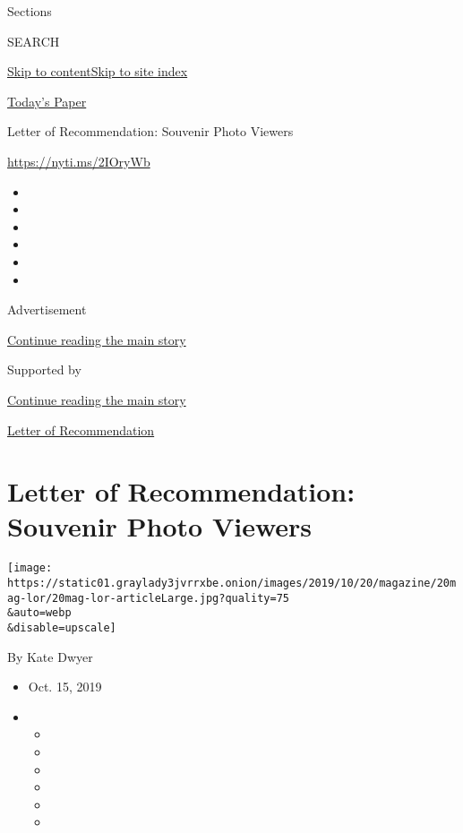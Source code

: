 Sections

SEARCH

\protect\hyperlink{site-content}{Skip to
content}\protect\hyperlink{site-index}{Skip to site index}

\href{https://myaccount.nytimes3xbfgragh.onion/auth/login?response_type=cookie\&client_id=vi}{}

\href{https://www.nytimes3xbfgragh.onion/section/todayspaper}{Today's
Paper}

Letter of Recommendation: Souvenir Photo Viewers

\url{https://nyti.ms/2IOryWb}

\begin{itemize}
\item
\item
\item
\item
\item
\item
\end{itemize}

Advertisement

\protect\hyperlink{after-top}{Continue reading the main story}

Supported by

\protect\hyperlink{after-sponsor}{Continue reading the main story}

\href{/column/letter-of-recommendation}{Letter of Recommendation}

\hypertarget{letter-of-recommendation-souvenir-photo-viewers}{%
\section{Letter of Recommendation: Souvenir Photo
Viewers}\label{letter-of-recommendation-souvenir-photo-viewers}}

\texttt{[image: https://static01.graylady3jvrrxbe.onion/images/2019/10/20/magazine/20mag-lor/20mag-lor-articleLarge.jpg?quality=75\\\&auto=webp\\\&disable=upscale]}

By Kate Dwyer

\begin{itemize}
\item
  Oct. 15, 2019
\item
  \begin{itemize}
  \item
  \item
  \item
  \item
  \item
  \item
  \end{itemize}
\end{itemize}

